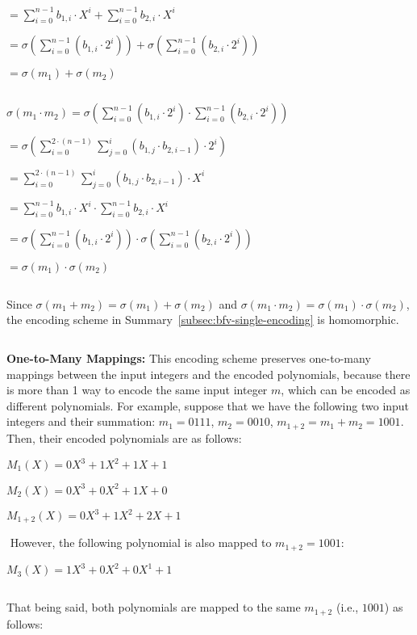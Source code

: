 $= \sum\limits_{i=0}^{n-1} b_{1,i}\cdot X^i + \sum\limits_{i=0}^{n-1} b_{2,i}\cdot X^i$

$= \sigma\left( \sum\limits_{i=0}^{n-1} (b_{1,i} \cdot 2^i)\right) + \sigma\left( \sum\limits_{i=0}^{n-1} (b_{2,i} \cdot 2^i) \right)$

$= \sigma(m_1) + \sigma(m_2)$

$ $

$\sigma (m_1 \cdot m_2) = \sigma\left(\sum\limits_{i=0}^{n-1}(b_{1, i} \cdot 2^i) \cdot \sum\limits_{i=0}^{n-1}(b_{2,i} \cdot 2^i)\right)$

$= \sigma\left(\sum\limits_{i=0}^{2\cdot(n-1)}\sum\limits_{j=0}^{i}(b_{1,j} \cdot b_{2,i-1})\cdot 2^i\right)$

$= \sum\limits_{i=0}^{2\cdot(n-1)}\sum\limits_{j=0}^{i}(b_{1,j} \cdot b_{2,i-1})\cdot X^i$

$ = \sum\limits_{i=0}^{n-1} b_{1,i}\cdot X^i \cdot \sum\limits_{i=0}^{n-1} b_{2,i}\cdot X^i$

$= \sigma\left( \sum\limits_{i=0}^{n-1} (b_{1,i} \cdot 2^i)\right) \cdot \sigma\left( \sum\limits_{i=0}^{n-1} (b_{2,i} \cdot 2^i) \right)$

$= \sigma(m_1) \cdot \sigma(m_2)$

$ $

Since $\sigma (m_1 + m_2) = \sigma(m_1) + \sigma(m_2)$ and $\sigma (m_1 \cdot m_2) = \sigma(m_1) \cdot \sigma(m_2)$, the encoding scheme in Summary~\ref*{subsec:bfv-single-encoding} is homomorphic.


$ $

\textbf{One-to-Many Mappings:} This encoding scheme preserves one-to-many mappings between the input integers and the encoded polynomials, because there is more than 1 way to encode the same input integer $m$, which can be encoded as different polynomials. For example, suppose that we have the following two input integers and their summation: $m_1 = 0111$, $m_2 = 0010$, $m_{1+2} = m_1 + m_2 = 1001$. Then, their encoded polynomials are as follows: 

$M_1(X) = 0X^3 + 1X^2 + 1X + 1$

$M_2(X) = 0X^3 + 0X^2 + 1X + 0$

$M_{1+2}(X) = 0X^3 + 1X^2 + 2X + 1$

$ $
However, the following polynomial is also mapped to $m_{1+2} = 1001$:

$M_{3}(X) = 1X^3 + 0X^2 + 0X^1 + 1$

$ $

That being said, both polynomials are mapped to the same $m_{1+2}$ (i.e., $1001$) as follows:

